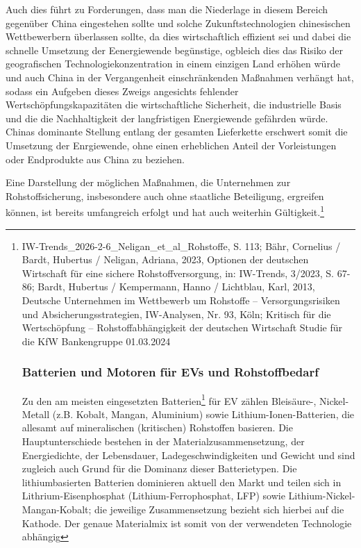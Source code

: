\documentclass[12pt,a4paper,oneside]{book} %
\begin{document}
{Auch dies führt zu Forderungen, dass man die Niederlage in diesem Bereich gegenüber China eingestehen sollte und solche Zukunftstechnologien chinesischen Wettbewerbern überlassen sollte, da dies wirtschaftlich effizient sei und dabei die schnelle Umsetzung der Eenergiewende begünstige, ogbleich dies das Risiko der geografischen Technologiekonzentration in einem einzigen Land erhöhen würde und auch China in der Vergangenheit  einschränkenden Maßnahmen verhängt hat, sodass ein Aufgeben dieses Zweigs angesichts fehlender Wertschöpfungskapazitäten die wirtschaftliche Sicherheit, die industrielle Basis und die die Nachhaltigkeit der langfristigen Energiewende gefährden würde.\autocite{Milo McBride, Battery Geopolitics: Balancing Industrial Power in the Race to Store Energy, S. 1} Chinas dominante Stellung entlang der gesamten Lieferkette erschwert somit die Umsetzung der Enrgiewende, ohne einen erheblichen Anteil der Vorleistungen oder Endprodukte aus China zu beziehen.\autocite{MERICS: Survival of the fiercest: How involution helps China dominate green tech globally}

Eine Darstellung der möglichen Maßnahmen, die Unternehmen zur Rohstoffsicherung, insbesondere auch ohne staatliche Beteiligung, ergreifen können, ist bereits umfangreich erfolgt und hat auch weiterhin Gültigkeit.\footnote{{IW-Trends_2026-2-6_Neligan_et_al_Rohstoffe, S. 113; Bähr, Cornelius / Bardt, Hubertus / Neligan, Adriana, 2023, Optionen der deutschen Wirtschaft für eine sichere Rohstoffversorgung, in: IW-Trends, 3/2023, S. 67-86; Bardt, Hubertus / Kempermann, Hanno / Lichtblau, Karl, 2013, Deutsche Unternehmen im Wettbewerb um Rohstoffe – Versorgungsrisiken und Absicherungsstrategien, IW-Analysen, Nr. 93, Köln; Kritisch für die Wertschöpfung – Rohstoffabhängigkeit der deutschen Wirtschaft Studie für die KfW Bankengruppe 01.03.2024}

\subsubsection{Batterien und Motoren für EVs und Rohstoffbedarf}
Zu den am meisten eingesetzten Batterien\footnote{Auch hier ist eine wichtige Abgrenzung zu treffen: Batterien in Bezug auf EV beziehen sich in erster Linie auf die Traktionsbatterien und nicht etwa die 12V-Starterbatterien, wie sie auch in Verbrennerfahrzeugen vorkommen.} für EV zählen Bleisäure-, Nickel-Metall (z.B. Kobalt, Mangan, Aluminium) sowie Lithium-Ionen-Batterien, die allesamt auf mineralischen (kritischen) Rohstoffen basieren. Die Hauptunterschiede bestehen in der Materialzusammensetzung, der Energiedichte, der Lebensdauer, Ladegeschwindigkeiten und Gewicht und sind zugleich auch Grund für die Dominanz dieser Batterietypen. Die lithiumbasierten Batterien dominieren aktuell den Markt und teilen sich in Lithrium-Eisenphosphat (Lithium-Ferrophosphat, LFP) sowie Lithium-Nickel-Mangan-Kobalt; die jeweilige Zusammensetzung bezieht sich hierbei auf die Kathode. Der genaue Materialmix ist somit von der verwendeten Technologie abhängig\autocite{bibDrawing lessons from mineral and land use policy in Europe: Crossing policy streams or getting stuck in silos?id}

}}
\end{document}
